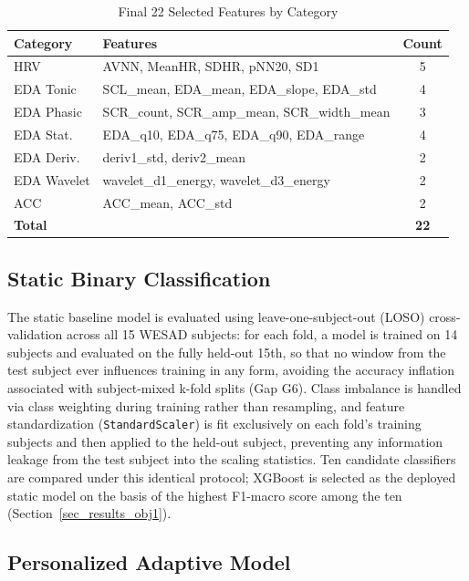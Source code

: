 \documentclass[conference]{IEEEtran}
\begin{document}
\begin{table}[htbp]
\caption{Final 22 Selected Features by Category}
\begin{center}
\begin{tabular}{|p{1.3cm}|p{5.1cm}|c|}
\hline
\textbf{Category} & \textbf{Features} & \textbf{Count} \\
\hline
HRV & AVNN, MeanHR, SDHR, pNN20, SD1 & 5 \\
\hline
EDA Tonic & SCL\_mean, EDA\_mean, EDA\_slope, EDA\_std & 4 \\
\hline
EDA Phasic & SCR\_count, SCR\_amp\_mean, SCR\_width\_mean & 3 \\
\hline
EDA Stat. & EDA\_q10, EDA\_q75, EDA\_q90, EDA\_range & 4 \\
\hline
EDA Deriv. & deriv1\_std, deriv2\_mean & 2 \\
\hline
EDA Wavelet & wavelet\_d1\_energy, wavelet\_d3\_energy & 2 \\
\hline
ACC & ACC\_mean, ACC\_std & 2 \\
\hline
\textbf{Total} & & \textbf{22} \\
\hline
\end{tabular}
\label{tab_features}
\end{center}
\end{table}

\subsection{Static Binary Classification}
The static baseline model is evaluated using
leave-one-subject-out (LOSO) cross-validation across all 15
WESAD subjects: for each fold, a model is trained on 14
subjects and evaluated on the fully held-out 15th, so that no
window from the test subject ever influences training in any
form, avoiding the accuracy inflation associated with
subject-mixed k-fold splits (Gap G6). Class imbalance is
handled via class weighting during training rather than
resampling, and feature standardization
(\texttt{StandardScaler}) is fit exclusively on each fold's
training subjects and then applied to the held-out subject,
preventing any information leakage from the test subject into
the scaling statistics. Ten candidate classifiers are compared
under this identical protocol; XGBoost is selected as the
deployed static model on the basis of the highest F1-macro
score among the ten (Section~\ref{sec_results_obj1}).

\subsection{Personalized Adaptive Model}
\end{document}
